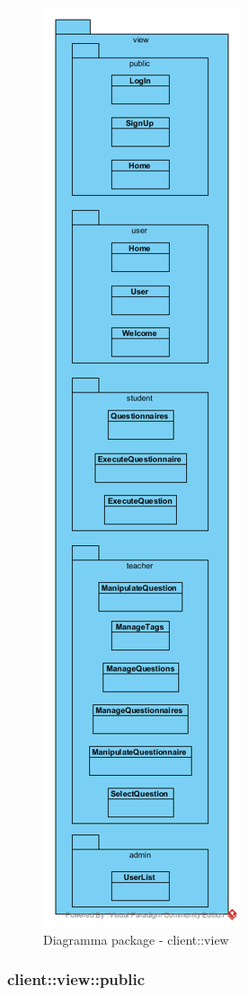 \begin{center}
	\begin{figure}[H]
		\centering \includegraphics[scale=4, max width=\textwidth, max height=\myheight]{../img/diagrammiClassi/client/view.png}
		\caption{Diagramma package - client::view}
	\end{figure}
\end{center}\subsubsection{client::view::public}
